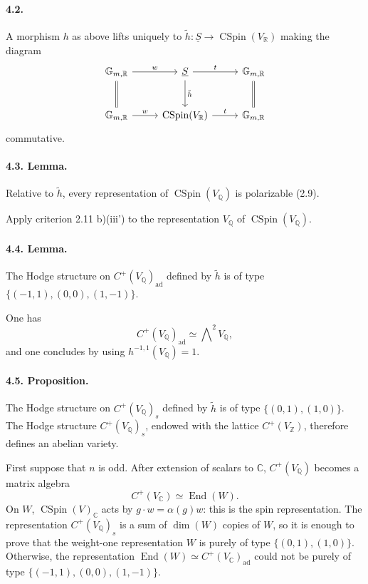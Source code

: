 \documentclass[10pt]{article}
\newcommand{\C}{\mathbb{C}}
\newcommand{\Q}{\mathbb{Q}}
\newcommand{\R}{\mathbb{R}}
\newcommand{\Z}{\mathbb{Z}}
\newcommand{\End}{\operatorname{End}}
\newcommand{\CSpin}{\operatorname{CSpin}}
\begin{document}
\paragraph{4.2.} A morphism $h$ as above lifts uniquely to $\tilde h:\underline S\to\CSpin(V_\R)$ making the diagram
\[
\begin{tikzcd}[column sep=2.6em,row sep=2.6em]
\mathbb G_{m,\R} \arrow[r,"w"] \arrow[d,equal] & \underline S \arrow[r,"t"] \arrow[d,"\tilde h"] & \mathbb G_{m,\R} \arrow[d,equal]\\
\mathbb G_{m,\R} \arrow[r,"w"] & \CSpin(V_\R) \arrow[r,"t"] & \mathbb G_{m,\R}
\end{tikzcd}
\]
commutative.




\paragraph{4.3. Lemma.} Relative to $\tilde h$, every representation of $\CSpin(V_\Q)$ is polarizable (2.9).

Apply criterion 2.11 b)(iii') to the representation $V_\Q$ of $\CSpin(V_\Q)$.

\paragraph{4.4. Lemma.} The Hodge structure on $C^+(V_\Q)_{\mathrm{ad}}$ defined by $\tilde h$ is of type $\{(-1,1),(0,0),(1,-1)\}$.

One has
\[
C^+(V_\Q)_{\mathrm{ad}}\simeq\bigwedge\nolimits^2 V_\Q,
\]
and one concludes by using $h^{-1,1}(V_\Q)=1$.

\paragraph{4.5. Proposition.} The Hodge structure on $C^+(V_\Q)_s$ defined by $\tilde h$ is of type $\{(0,1),(1,0)\}$. The Hodge structure $C^+(V_\Q)_s$, endowed with the lattice $C^+(V_\Z)$, therefore defines an abelian variety.

First suppose that $n$ is odd. After extension of scalars to $\C$, $C^+(V_\Q)$ becomes a matrix algebra
\[
C^+(V_\C)\simeq\End(W).
\]
On $W$, $\CSpin(V)_\C$ acts by $g\cdot w=\alpha(g)w$: this is the spin representation. The representation $C^+(V_\Q)_s$ is a sum of $\dim(W)$ copies of $W$, so it is enough to prove that the weight-one representation $W$ is purely of type $\{(0,1),(1,0)\}$. Otherwise, the representation $\End(W)\simeq C^+(V_\C)_{\mathrm{ad}}$ could not be purely of type $\{(-1,1),(0,0),(1,-1)\}$.
\end{document}
